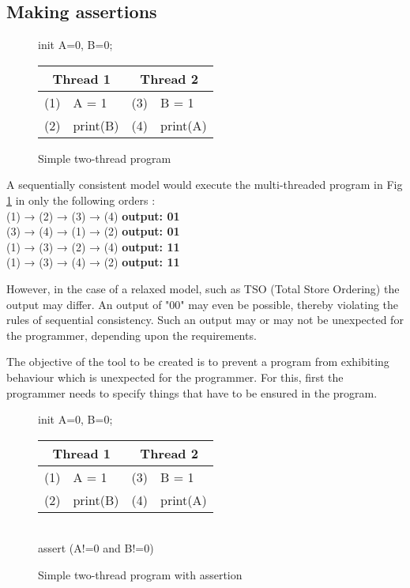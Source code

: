 \subsection{Making assertions}

\begin{figure}[!htb]
\begin{center}
init A=0, B=0;\\
    \begin{tabular}{c l | c l }
     \multicolumn{2}{c|}{Thread 1} & \multicolumn{2}{c}{Thread 2} \\ 
     \hline
     (1) & A = 1 & (3) & B = 1 \\  
     (2) & print(B) & (4) &  print(A)
    \end{tabular}
    \caption{Simple two-thread program}\label{fig:dekker1}
\end{center}
\end{figure}

\par
A sequentially consistent model would execute the multi-threaded program in Fig \ref{fig:dekker1} in only the following orders \cite{web2}:\\

(1) → (2) → (3) → (4)  \textbf{output: 01}\\
(3) → (4) → (1) → (2)  \textbf{output: 01}\\
(1) → (3) → (2) → (4)  \textbf{output: 11}\\
(1) → (3) → (4) → (2)  \textbf{output: 11}\\

\par
However, in the case of a relaxed model, such as TSO (Total Store Ordering) the output may differ. An output of "00" may even be possible, thereby violating the rules of sequential consistency. Such an output may or may not be unexpected for the programmer, depending upon the requirements.

\par
The objective of the tool to be created is to prevent a program from exhibiting behaviour which is unexpected for the programmer. For this, first the programmer needs to specify things that have to be ensured in the program.
\begin{figure}[!htb]
\begin{center}
init A=0, B=0;\\
    \begin{tabular}{c l | c l }
     \multicolumn{2}{c|}{Thread 1} & \multicolumn{2}{c}{Thread 2} \\ 
     \hline
     (1) & A = 1 & (3) & B = 1 \\  
     (2) & print(B) & (4) &  print(A)\\
    \end{tabular}\\
assert (A!=0 and B!=0)
    \caption{Simple two-thread program with assertion}\label{fig:dekker2}
\end{center}
\end{figure}

